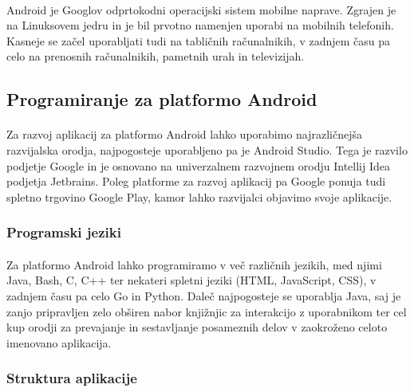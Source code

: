 \paragraph{}Android je Googlov odprtokodni\cite{android-source} operacijski sistem mobilne naprave. Zgrajen je na Linuksovem jedru\cite{linux-kernel-wiki} in je bil prvotno namenjen uporabi na mobilnih telefonih. Kasneje se začel uporabljati tudi na tabličnih računalnikih, v zadnjem času pa celo na prenosnih računalnikih, pametnih urah in televizijah.

\subsection{Programiranje za platformo Android}
\paragraph{}Za razvoj aplikacij za platformo Android lahko uporabimo najrazličnejša razvijalska orodja, najpogosteje uporabljeno pa je Android Studio. Tega je razvilo podjetje Google in je osnovano na univerzalnem razvojnem orodju Intellij Idea\cite{intellij-idea} podjetja Jetbrains. Poleg platforme za razvoj aplikacij pa Google ponuja tudi spletno trgovino Google Play, kamor lahko razvijalci objavimo svoje aplikacije.

\subsubsection{Programski jeziki}
\paragraph{}Za platformo Android lahko programiramo v več različnih jezikih, med njimi Java, Bash, C, C++ ter nekateri spletni jeziki (HTML, JavaScript, CSS), v zadnjem času pa celo Go in Python. Daleč najpogosteje se uporablja Java, saj je zanjo pripravljen zelo obširen nabor knjižnjic za interakcijo z uporabnikom ter cel kup orodji za prevajanje in sestavljanje posameznih delov v zaokroženo celoto imenovano aplikacija.

\subsubsection{Struktura aplikacije}
